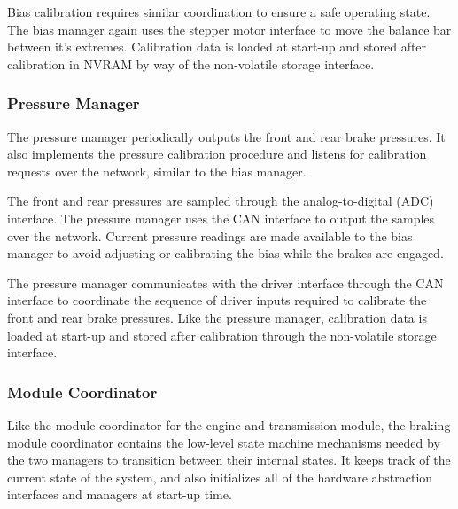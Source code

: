 Bias calibration requires similar coordination to ensure a safe operating state. The bias manager again uses the stepper motor interface to move the balance bar between it's extremes. Calibration data is loaded at start-up and stored after calibration in NVRAM by way of the non-volatile storage interface.

\subsubsection{Pressure Manager}

The pressure manager periodically outputs the front and rear brake pressures. It also implements the pressure calibration procedure and listens for calibration requests over the network, similar to the bias manager.

The front and rear pressures are sampled through the analog-to-digital (ADC) interface. The pressure manager uses the CAN interface to output the samples over the network. Current pressure readings are made available to the bias manager to avoid adjusting or calibrating the bias while the brakes are engaged.

The pressure manager communicates with the driver interface through the CAN interface to coordinate the sequence of driver inputs required to calibrate the front and rear brake pressures. Like the pressure manager, calibration data is loaded at start-up and stored after calibration through the non-volatile storage interface.

\subsubsection{Module Coordinator}

Like the module coordinator for the engine and transmission module, the braking module coordinator contains the low-level state machine mechanisms needed by the two managers to transition between their internal states. It keeps track of the current state of the system, and also initializes all of the hardware abstraction interfaces and managers at start-up time. 

